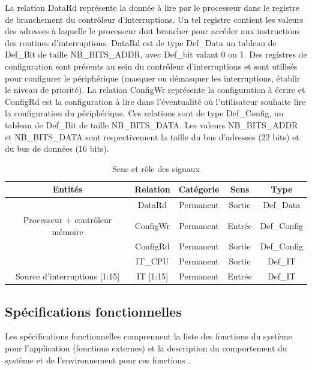 La relation DataRd représente la donnée à lire par le processeur dans le registre de branchement du contrôleur d'interruptions.
Un tel registre contient les valeurs des adresses à laquelle le processeur doit brancher pour accéder aux instructions des routines d'interruptions.
DataRd est de type Def\_Data un tableau de Def\_Bit de taille NB\_BITS\_ADDR, avec Def\_bit valant 0 ou 1.
Des registres de configuration sont présents au sein du contrôleur d'interruptions et sont utilisés pour configurer le périphérique (masquer ou démasquer les interruptions, établir le niveau de priorité).
La relation ConfigWr représente la configuration à écrire et ConfigRd est la configuration à lire dans l'éventualité où l'utilisateur souhaite lire la configuration du périphérique.
Ces relations sont de type Def\_Config, un tableau de Def\_Bit de taille NB\_BITS\_DATA. 
Les valeurs NB\_BITS\_ADDR et NB\_BITS\_DATA sont respectivement la taille du bus d'adresses (22 bits) et du bus de données (16 bits).

\begin{table}[H]
	\centering
	\begin{tabular}{|c|c|c|c|c|}
		\hline
		Entités & Relation & Catégorie & Sens & Type\\
		\hline
		 & DataRd & Permanent & Sortie & Def\_Data \\
		Processeur + contrôleur mémoire & ConfigWr & Permanent & Entrée & Def\_Config \\
		& ConfigRd & Permanent & Sortie & Def\_Config \\
		& IT\_CPU & Permanent & Sortie & Def\_IT\\
		\hline
		Source d'interruptions [1:15] & IT [1:15] & Permanent & Entrée & Def\_IT\\
		\hline
	\end{tabular}
	\caption{Sens et rôle des signaux}
	\label{tab:entrees_sorties_composant}
\end{table}

\subsection{Spécifications fonctionnelles}
Les spécifications fonctionnelles comprennent la liste des fonctions du système
pour l'application (fonctions externes) et la description du comportement du système et
de l'environnement pour ces fonctions \cite{Calvez_2}.

\gap

